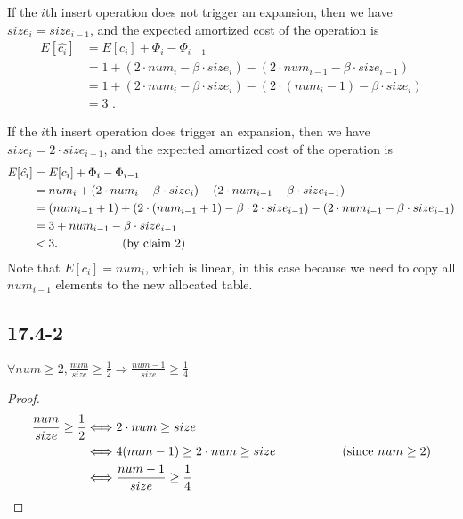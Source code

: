 If the $i$th insert operation does not trigger an expansion,
then we have $size_i = size_{i-1}$, and 
the expected amortized cost of the operation is
\begin{equation*}
\begin{split}
    E[\hat{c_i}] & = E[c_i] + \Phi_i - \Phi_{i-1} \\
    & = 1 + (2 \cdot num_i - \beta \cdot size_i) - (2 \cdot num_{i-1} - \beta \cdot size_{i-1}) \\
    & = 1 + (2 \cdot num_i - \beta \cdot size_i) - (2 \cdot (num_i - 1) - \beta \cdot size_i) \\
    & = 3 \text{ .} 
\end{split}
\end{equation*}

If the $i$th insert operation does trigger an expansion,
then we have $size_i = 2 \cdot size_{i-1}$, and 
the expected amortized cost of the operation is
\begin{equation*}
\begin{split}
    E[\hat{c_i}] & = E[c_i] + \Phi_i - \Phi_{i-1} \\
    & = num_i + (2 \cdot num_i - \beta \cdot size_i) - (2 \cdot num_{i-1} - \beta \cdot size_{i-1}) \\
    & = (num_{i-1} + 1) + (2 \cdot (num_{i-1} + 1) - \beta \cdot 2 \cdot size_{i-1}) 
        - (2 \cdot num_{i-1} - \beta \cdot size_{i-1}) \\
    & = 3 + num_{i-1} - \beta \cdot size_{i-1} \\
    & < 3 \text{. \quad\quad\quad\quad\quad (by claim 2)}
\end{split}
\end{equation*}
Note that $E[c_i] = num_i$, which is linear, in this case
because we need to copy all $num_{i-1}$ elements 
to the new allocated table.

\subsection*{17.4-2}

\begin{claim}
    $\forall num \geq 2, \frac{num}{size} \geq \frac{1}{2}
    \Longrightarrow \frac{num - 1}{size} \geq \frac{1}{4}$
\end{claim}

\begin{proof}
    \begin{equation*}
    \begin{split}
        \frac{num}{size} \geq \frac{1}{2}
        & \Longleftrightarrow
        2 \cdot num \geq size \\
        & \Longleftrightarrow
        4(num - 1) \geq 2 \cdot num \geq size 
        \text{ \quad\quad\quad\quad\quad 
        (since $num \geq 2$)}\\
        & \Longleftrightarrow
        \frac{num - 1}{size} \geq \frac{1}{4} \\
    \end{split}
    \end{equation*}
\end{proof}

